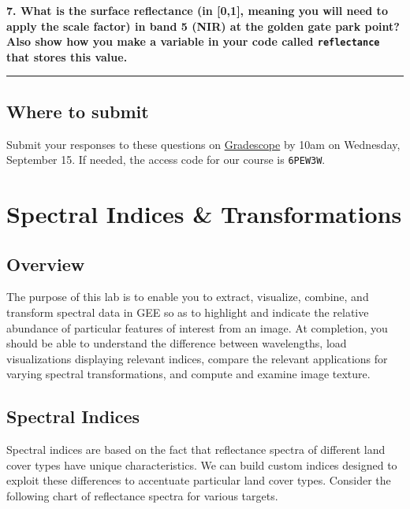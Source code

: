 \documentclass[
]{article}
\begin{document}
\textbf{7. What is the surface reflectance (in {[}0,1{]}, meaning you will need to apply the scale factor) in band 5 (NIR) at the golden gate park point? Also show how you make a variable in your code called \texttt{reflectance} that stores this value.}

\begin{center}\rule{0.5\linewidth}{0.5pt}\end{center}

\hypertarget{where-to-submit-1}{%
\subsection*{Where to submit}\label{where-to-submit-1}}

Submit your responses to these questions on \href{https://www.gradescope.com/courses/293173/assignments/1446622/submissions}{Gradescope} by 10am on Wednesday, September 15. If needed, the access code for our course is \texttt{6PEW3W}.

\hypertarget{spectral-indices-transformations}{%
\section{Spectral Indices \& Transformations}\label{spectral-indices-transformations}}

\hypertarget{overview-3}{%
\subsection*{Overview}\label{overview-3}}

The purpose of this lab is to enable you to extract, visualize, combine, and transform spectral data in GEE so as to highlight and indicate the relative abundance of particular features of interest from an image. At completion, you should be able to understand the difference between wavelengths, load visualizations displaying relevant indices, compare the relevant applications for varying spectral transformations, and compute and examine image texture.

\hypertarget{spectral-indices}{%
\subsection{Spectral Indices}\label{spectral-indices}}

Spectral indices are based on the fact that reflectance spectra of different land cover types have unique characteristics. We can build custom indices designed to exploit these differences to accentuate particular land cover types. Consider the following chart of reflectance spectra for various targets.
\end{document}
